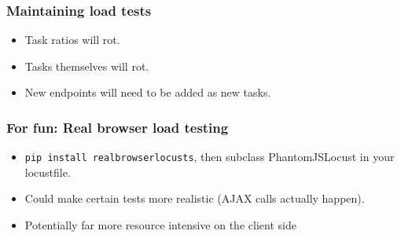 \documentclass{beamer}
\begin{document}
\begin{frame}
\frametitle{Maintaining load tests}
\begin{itemize}
\item Task ratios will rot.\pause
\item Tasks themselves will rot.\pause
\item New endpoints will need to be added as new tasks.
\end{itemize}
\end{frame}


\begin{frame}
\frametitle{For fun: Real browser load testing}
\begin{itemize}
\item \texttt{pip install realbrowserlocusts}, then subclass PhantomJSLocust in
      your locustfile.
\item Could make certain tests more realistic (AJAX calls actually happen).
\item Potentially far more resource intensive on the client side
\end{itemize}
\end{frame}
\end{document}
